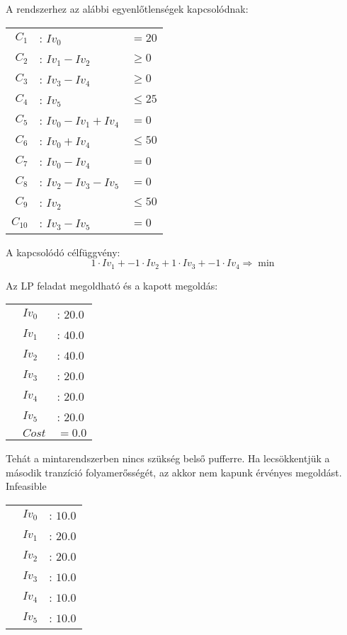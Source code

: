 A rendszerhez az alábbi egyenlőtlenségek kapcsolódnak:

\begin{center}
\begin{tabular}{rll}
$C_1$ &: $Iv_0$ &$= 20$ \\
$C_2$ &: $Iv_1 - Iv_2$ &$\geq 0$\\
$C_3$ &: $Iv_3 - Iv_4$ &$\geq 0$\\
$C_4$ &: $Iv_5$ &$\leq 25$\\
$C_5$ &: $Iv_0 - Iv_1 + Iv_4$ &$= 0$\\
$C_6$ &: $Iv_0 + Iv_4 $&$\leq 50$\\
$C_7$ &: $Iv_0 - Iv_4 $&$= 0$\\
$C_8$ &: $Iv_2 - Iv_3 - Iv_5$&$= 0$\\
$C_9$ &: $Iv_2 $&$\leq 50$\\
$C_{10}$ &: $Iv_3 - Iv_5 $&$= 0$
\end{tabular}
\end{center}

A kapcsolódó célfüggvény:
$$1\cdot Iv_1 + -1\cdot Iv_2 + 1\cdot Iv_3 + -1\cdot Iv_4\Rightarrow \min$$

Az LP feladat megoldható és a kapott megoldás:
\begin{center}
\begin{tabular}{rll}
&$Iv_0$ &: $20.0$\\
&$Iv_1$ &: $40.0$\\
&$Iv_2$ &: $40.0$\\
&$Iv_3$ &: $20.0$\\
&$Iv_4$ &: $20.0$\\
&$Iv_5$ &: $20.0$\\
&$Cost$ & $= 0.0$
\end{tabular}
\end{center}
Tehát a mintarendszerben nincs szükség belső pufferre. 
Ha lecsökkentjük a második tranzíció folyamerősségét, az akkor nem kapunk érvényes megoldást. \\
Infeasible
\begin{center}
\begin{tabular}{rll}
&$Iv_0$ &: $10.0$\\
&$Iv_1$ &: $20.0$\\
&$Iv_2$ &: $20.0$\\
&$Iv_3$ &: $10.0$\\
&$Iv_4$ &: $10.0$\\
&$Iv_5$ &: $10.0$
\end{tabular}
\end{center}